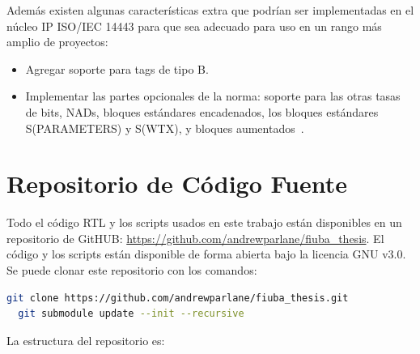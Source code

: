 \documentclass[a4paper, twoside, 11pt]{report}
\begin{document}
Además existen algunas características extra que podrían ser implementadas en el núcleo IP ISO/IEC 14443 para que sea adecuado para uso en un rango más amplio de proyectos:

\begin{itemize}
  \item Agregar soporte para tags de tipo B.
  \item Implementar las partes opcionales de la norma: soporte para las otras tasas de bits, NADs, bloques estándares encadenados, los bloques estándares S(PARAMETERS) y S(WTX), y bloques aumentados~\cite{iso14443-2}\cite{iso14443-4}.
\end{itemize}


\appendix

\titleformat{\chapter}[display]
{\normalfont\Huge\bfseries}{\chaptertitlename\ \thechapter:}{0.2em}{\huge}

\newpage
\chapter{Repositorio de Código Fuente}
\label{appendix:code_repo}

Todo el código RTL y los scripts usados en este trabajo están disponibles en un repositorio de GitHUB: \url{https://github.com/andrewparlane/fiuba_thesis}. El código y los scripts están disponible de forma abierta bajo la licencia GNU v3.0. Se puede clonar este repositorio con los comandos:

\begin{lstlisting}[language=bash,basicstyle=\small\ttfamily]
  git clone https://github.com/andrewparlane/fiuba_thesis.git
  git submodule update --init --recursive
\end{lstlisting}

La estructura del repositorio es:

\vspace{1em}
\end{document}

